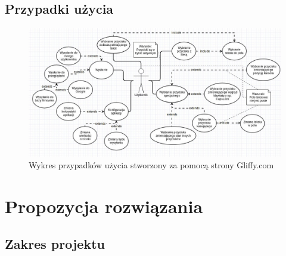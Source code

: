 \documentclass[twoside,a4paper]{book}
\begin{document}
\subsection{Przypadki użycia}
\begin{figure}[!h]
		\centering
		\includegraphics[scale=0.4]{img/useCase.jpg}
		\caption{Wykres przypadków użycia stworzony za pomocą strony Gliffy.com}
		\label{fig:useCase}
\end{figure}

\section{Propozycja rozwiązania}
\subsection{Zakres projektu}
\end{document}
